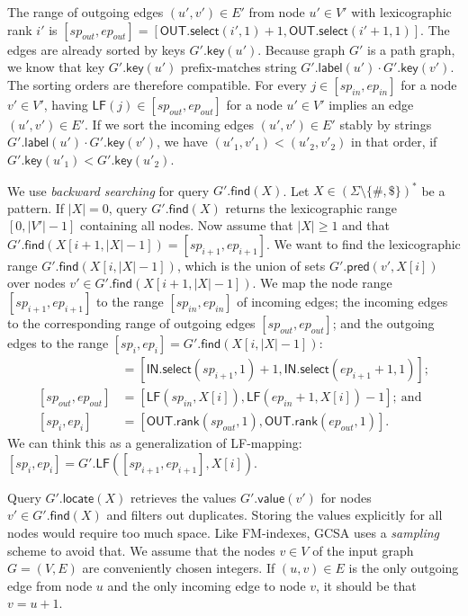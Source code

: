 \documentclass[a4paper,UKenglish]{lipics-v2016}
\newcommand{\set}[1]{\ensuremath{\{ #1 \}}}
\newcommand{\abs}[1]{\ensuremath{\lvert #1 \rvert}}
\newcommand{\rank}{\ensuremath{\mathsf{rank}}}
\newcommand{\select}{\ensuremath{\mathsf{select}}}
\newcommand{\LF}{\ensuremath{\mathsf{LF}}}
\newcommand{\find}{\ensuremath{\mathsf{find}}}
\newcommand{\locate}{\ensuremath{\mathsf{locate}}}
\newcommand{\glabel}{\ensuremath{\mathsf{label}}}
\newcommand{\gpred}{\ensuremath{\mathsf{pred}}}
\newcommand{\gkey}{\ensuremath{\mathsf{key}}}
\newcommand{\gvalue}{\ensuremath{\mathsf{value}}}
\newcommand{\LFmapping}{LF\nobreakdash-mapping}
\newcommand{\patternset}{\ensuremath{(\Sigma \setminus \set{\#, \$})^{\ast}}}
\newcommand{\bvIN}{\ensuremath{\mathsf{IN}}}
\newcommand{\bvOUT}{\ensuremath{\mathsf{OUT}}}
\begin{document}
The range of outgoing edges $(u', v') \in E'$ from node $u' \in V'$ with lexicographic rank $i'$ is $[sp_{out}, ep_{out}] = [\bvOUT.\select(i', 1) + 1, \bvOUT.\select(i'+1, 1)]$. The edges are already sorted by keys $G'.\gkey(u')$. Because graph $G'$ is a path graph, we know that key $G'.\gkey(u')$ prefix-matches string $G'.\glabel(u') \cdot G'.\gkey(v')$. The sorting orders are therefore compatible. For every $j \in [sp_{in}, ep_{in}]$ for a node $v' \in V'$, having $\LF(j) \in [sp_{out}, ep_{out}]$ for a node $u' \in V'$ implies an edge $(u', v') \in E'$. If we sort the incoming edges $(u', v') \in E'$ stably by strings $G'.\glabel(u') \cdot G'.\gkey(v')$, we have $(u'_{1}, v'_{1}) < (u'_{2}, v'_{2})$ in that order, if $G'.\gkey(u'_{1}) < G'.\gkey(u'_{2})$.

We use \emph{backward searching} for query $G'.\find(X)$. Let $X \in \patternset$ be a pattern. If $\abs{X} = 0$, query $G'.\find(X)$ returns the lexicographic range $[0, \abs{V'}-1]$ containing all nodes. Now assume that $\abs{X} \ge 1$ and that $G'.\find(X[i+1, \abs{X}-1]) = [sp_{i+1}, ep_{i+1}]$. We want to find the lexicographic range $G'.\find(X[i, \abs{X}-1])$, which is the union of sets $G'.\gpred(v', X[i])$ over nodes $v' \in G'.\find(X[i+1, \abs{X}-1])$. We map the node range $[sp_{i+1}, ep_{i+1}]$ to the range $[sp_{in}, ep_{in}]$ of incoming edges; the incoming edges to the corresponding range of outgoing edges $[sp_{out}, ep_{out}]$; and the outgoing edges to the range $[sp_{i}, ep_{i}] = G'.\find(X[i, \abs{X}-1])$:
\begin{align*}
[sp_{in}, ep_{in}] & = [\bvIN.\select(sp_{i+1}, 1) + 1, \bvIN.\select(ep_{i+1}+1, 1)]; \\
[sp_{out}, ep_{out}] & = [\LF(sp_{in}, X[i]), \LF(ep_{in}+1, X[i]) - 1];\ \textrm{and} \\
[sp_{i}, ep_{i}] & = [\bvOUT.\rank(sp_{out}, 1), \bvOUT.\rank(ep_{out}, 1)].
\end{align*}
We can think this as a generalization of \LFmapping: $[sp_{i}, ep_{i}] = G'.\LF([sp_{i+1}, ep_{i+1}], X[i])$.

Query $G'.\locate(X)$ retrieves the values $G'.\gvalue(v')$ for nodes $v' \in G'.\find(X)$ and filters out duplicates. Storing the values explicitly for all nodes would require too much space. Like FM\nobreakdash-indexes, GCSA uses a \emph{sampling} scheme to avoid that. We assume that the nodes $v \in V$ of the input graph $G = (V, E)$ are conveniently chosen integers. If $(u, v) \in E$ is the only outgoing edge from node $u$ and the only incoming edge to node $v$, it should be that $v = u+1$.
\end{document}

